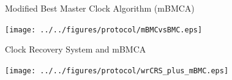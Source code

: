 \documentclass[compress,red]{beamer}
\newcommand{\backupend}{
   \addtocounter{framenumberappendix}{-\value{framenumber}}
   \addtocounter{framenumber}{\value{framenumberappendix}} 
}
\begin{document}
\begin{frame}{Modified Best Master Clock Algorithm (mBMCA)}

    \begin{center}
    \texttt{[image: ../../figures/protocol/mBMCvsBMC.eps]}
    \end{center}


\end{frame}
\begin{frame}{Clock Recovery System and mBMCA}


  \begin{center}
  \texttt{[image: ../../figures/protocol/wrCRS\_plus\_mBMC.eps]}
  \end{center}

\end{frame}




\backupend

\end{document}
